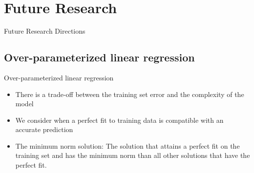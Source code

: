 \documentclass[aspectratio=169]{beamer}
\begin{document}
\section{Future Research}
\begin{frame}[c]
\centering
\Huge Future Research Directions
\end{frame}

\subsection{Over-parameterized linear regression}
\begin{frame}{Over-parameterized linear regression}
\begin{itemize}
\setlength\itemsep{1.5em}
\item There is a trade-off between the training set error and the complexity of the model
\item We consider when a perfect fit to training data is compatible with an accurate prediction
\item The minimum norm solution: The solution that attains a perfect fit on the training set and has the minimum norm than all other solutions that have the perfect fit.
\end{itemize}

\end{frame}
\end{document}
